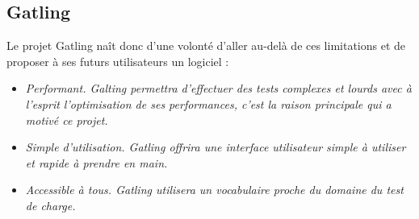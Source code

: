 \subsection{Gatling}
Le projet Gatling naît donc d'une volonté d'aller au-delà de ces limitations et de proposer à ses futurs utilisateurs un logiciel :
\begin{itemize}
  \item \em{Performant}. Galting permettra d'effectuer des tests complexes et lourds avec à l'esprit l'optimisation de ses performances, c'est la raison principale qui a motivé ce projet.
  \item \em{Simple d'utilisation}. Gatling offrira une interface utilisateur simple à utiliser et rapide à prendre en main.
  \item \em{Accessible à tous}. Gatling utilisera un vocabulaire proche du domaine du test de charge.
\end{itemize}